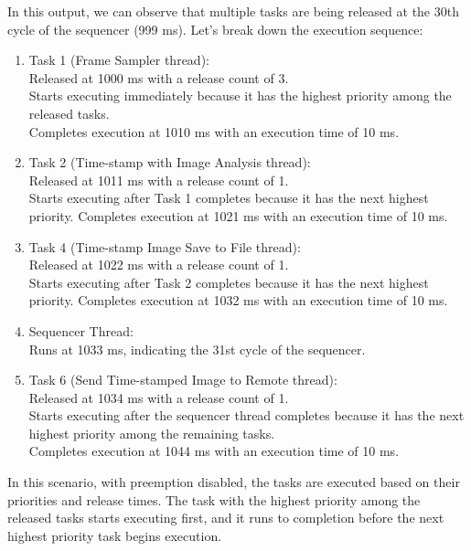\documentclass[a4paper,11pt]{article}%
\newenvironment{qanda}{\setlength{\parindent}{0pt}}{\bigskip}
\begin{document}
\begin{qanda}
\begin{enumerate}
			In this output, we can observe that multiple tasks are being released at the 30th cycle of the sequencer (999 ms). Let's break down the execution sequence:
			\begin{enumerate}
				\item Task 1 (Frame Sampler thread):\\
				      Released at 1000 ms with a release count of 3.\\
				      Starts executing immediately because it has the highest priority among the released tasks.\\
				      Completes execution at 1010 ms with an execution time of 10 ms.
				\item Task 2 (Time-stamp with Image Analysis thread):\\
				      Released at 1011 ms with a release count of 1.\\
				      Starts executing after Task 1 completes because it has the next highest priority.
				      Completes execution at 1021 ms with an execution time of 10 ms.\\
				\item Task 4 (Time-stamp Image Save to File thread):\\
				      Released at 1022 ms with a release count of 1.\\
				      Starts executing after Task 2 completes because it has the next highest priority.
				      Completes execution at 1032 ms with an execution time of 10 ms.\\
				\item Sequencer Thread:\\
				      Runs at 1033 ms, indicating the 31st cycle of the sequencer.\\
				\item Task 6 (Send Time-stamped Image to Remote thread):\\
				      Released at 1034 ms with a release count of 1.\\
				      Starts executing after the sequencer thread completes because it has the next highest priority among the remaining tasks.\\
				      Completes execution at 1044 ms with an execution time of 10 ms.
			\end{enumerate}




			In this scenario, with preemption disabled, the tasks are executed based on their priorities and release times. The task with the highest priority among the released tasks starts executing first, and it runs to completion before the next highest priority task begins execution.


\end{enumerate}
\end{qanda}
\end{document}
